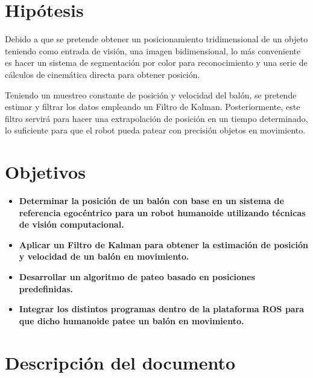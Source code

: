 	
\section{Hipótesis}
	Debido a que se pretende obtener un posicionamiento tridimensional de un objeto teniendo como entrada de visión, una imagen bidimensional, lo más conveniente es hacer un sistema de segmentación por color para reconocimiento y una serie de cálculos de cinemática directa para obtener posición.
	
	Teniendo un muestreo constante de posición y velocidad del balón, se pretende estimar y filtrar los datos empleando un Filtro de Kalman. Posteriormente, este filtro servirá para hacer una extrapolación de posición en un tiempo determinado, lo suficiente para que el robot pueda patear con precisión objetos en movimiento. 
	
	
\section{Objetivos}
		\begin{itemize}
			\item \textbf{Determinar la posición de un balón con base en un sistema de referencia egocéntrico para un robot humanoide utilizando técnicas de visión computacional.}
			
			\item \textbf{Aplicar un Filtro de Kalman para obtener la estimación de posición y velocidad de un balón en movimiento.}
			
			\item \textbf{Desarrollar un algoritmo de pateo basado en posiciones predefinidas.}
			
			\item \textbf{Integrar los distintos programas dentro de la plataforma ROS para que dicho humanoide patee un balón en movimiento.}
		\end{itemize}

\section{Descripción del documento}
